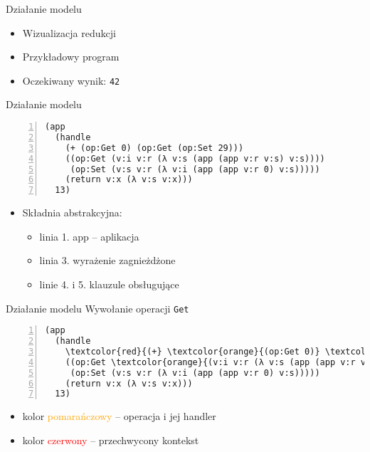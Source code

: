 \documentclass{beamer}
\begin{document}
\begin{frame}[fragile]{Działanie modelu}
  \begin{itemize}
    \item Wizualizacja redukcji
    \item Przykładowy program
    \item Oczekiwany wynik: \texttt{42}
  \end{itemize}
\end{frame}

\begin{frame}[fragile]{Działanie modelu}
\begin{Verbatim}[numbers=left]
(app
  (handle
    (+ (op:Get 0) (op:Get (op:Set 29)))
    ((op:Get (v:i v:r (λ v:s (app (app v:r v:s) v:s))))
     (op:Set (v:s v:r (λ v:i (app (app v:r 0) v:s)))))
    (return v:x (λ v:s v:x)))
  13)
\end{Verbatim}
\begin{itemize}
  \item Składnia abstrakcyjna:
  \begin{itemize}
    \item linia 1. app -- aplikacja
    \item linia 3. wyrażenie zagnieżdżone
    \item linie 4. i 5. klauzule obsługujące
  \end{itemize}
\end{itemize}
\end{frame}

\begin{frame}[fragile]{Działanie modelu}
Wywołanie operacji \texttt{Get}
\begin{Verbatim}[commandchars=\\\{\},numbers=left]
(app
  (handle
    \textcolor{red}{(+} \textcolor{orange}{(op:Get 0)} \textcolor{red}{(op:Get (op:Set 29)))}
    ((op:Get \textcolor{orange}{(v:i v:r (λ v:s (app (app v:r v:s) v:s)))})
     (op:Set (v:s v:r (λ v:i (app (app v:r 0) v:s)))))
    (return v:x (λ v:s v:x)))
  13)
\end{Verbatim}
\begin{itemize}
  \item kolor \textcolor{orange}{pomarańczowy} -- operacja i jej handler
  \item kolor \textcolor{red}{czerwony} -- przechwycony kontekst
\end{itemize}
\end{frame}
\end{document}
